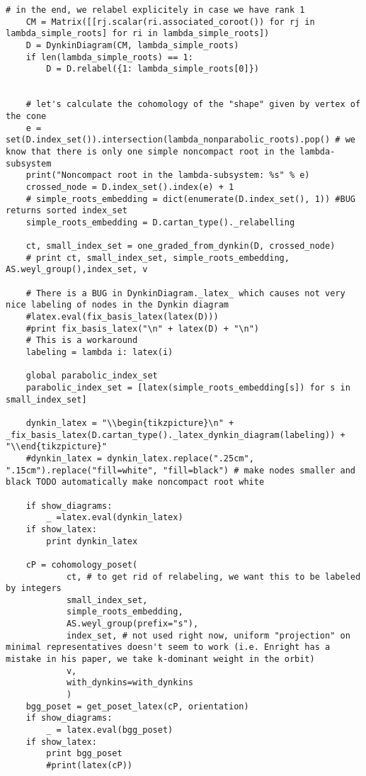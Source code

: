 \begin{verbatim}
# in the end, we relabel explicitely in case we have rank 1
    CM = Matrix([[rj.scalar(ri.associated_coroot()) for rj in lambda_simple_roots] for ri in lambda_simple_roots])
    D = DynkinDiagram(CM, lambda_simple_roots)
    if len(lambda_simple_roots) == 1:
        D = D.relabel({1: lambda_simple_roots[0]})


    # let's calculate the cohomology of the "shape" given by vertex of the cone
    e = set(D.index_set()).intersection(lambda_nonparabolic_roots).pop() # we know that there is only one simple noncompact root in the lambda-subsystem
    print("Noncompact root in the lambda-subsystem: %s" % e)
    crossed_node = D.index_set().index(e) + 1
    # simple_roots_embedding = dict(enumerate(D.index_set(), 1)) #BUG returns sorted index_set
    simple_roots_embedding = D.cartan_type()._relabelling

    ct, small_index_set = one_graded_from_dynkin(D, crossed_node)
    # print ct, small_index_set, simple_roots_embedding, AS.weyl_group(),index_set, v

    # There is a BUG in DynkinDiagram._latex_ which causes not very nice labeling of nodes in the Dynkin diagram
    #latex.eval(fix_basis_latex(latex(D)))
    #print fix_basis_latex("\n" + latex(D) + "\n")
    # This is a workaround
    labeling = lambda i: latex(i)

    global parabolic_index_set
    parabolic_index_set = [latex(simple_roots_embedding[s]) for s in small_index_set]

    dynkin_latex = "\\begin{tikzpicture}\n" + _fix_basis_latex(D.cartan_type()._latex_dynkin_diagram(labeling)) + "\\end{tikzpicture}"
    #dynkin_latex = dynkin_latex.replace(".25cm", ".15cm").replace("fill=white", "fill=black") # make nodes smaller and black TODO automatically make noncompact root white

    if show_diagrams:
        _ =latex.eval(dynkin_latex)
    if show_latex:
        print dynkin_latex

    cP = cohomology_poset(
            ct, # to get rid of relabeling, we want this to be labeled by integers
            small_index_set,
            simple_roots_embedding,
            AS.weyl_group(prefix="s"),
            index_set, # not used right now, uniform "projection" on minimal representatives doesn't seem to work (i.e. Enright has a mistake in his paper, we take k-dominant weight in the orbit)
            v,
            with_dynkins=with_dynkins
            )
    bgg_poset = get_poset_latex(cP, orientation)
    if show_diagrams:
        _ = latex.eval(bgg_poset)
    if show_latex:
        print bgg_poset
        #print(latex(cP))


\end{verbatim}

